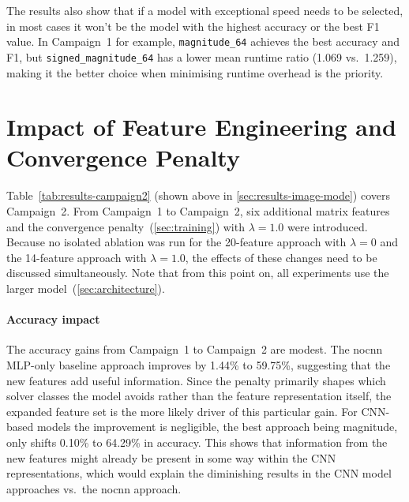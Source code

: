 The results also show that if a model with exceptional speed needs to be selected, in most cases it won't be the model with the
highest accuracy or the best F1 value.
In Campaign~1 for example, \texttt{magnitude\_64} achieves the best accuracy and F1, but \texttt{signed\_magnitude\_64} has a lower mean runtime ratio (1.069 vs.\ 1.259), making it the better choice when minimising runtime overhead is the priority.

\section{Impact of Feature Engineering and Convergence Penalty}\label{sec:results-features}

Table~\ref{tab:results-campaign2} (shown above in \autoref{sec:results-image-mode}) covers Campaign~2.
From Campaign~1 to Campaign~2, six additional matrix features and the convergence penalty~(\autoref{sec:training}) with $\lambda=1.0$ were introduced.
Because no isolated ablation was run for the 20-feature approach with $\lambda=0$ and the 14-feature approach with
$\lambda=1.0$, the effects of these changes need to be discussed simultaneously.
Note that from this point on, all experiments use the larger model~(\autoref{sec:architecture}).

\paragraph{Accuracy impact}
The accuracy gains from Campaign~1 to Campaign~2 are modest.
The nocnn MLP-only baseline approach improves by 1.44\% to 59.75\%, suggesting that the new features add useful
information.
Since the penalty primarily shapes which solver classes the model avoids rather than the feature representation itself, the
expanded feature set is the more likely driver of this particular gain.
For CNN-based models the improvement is negligible, the best approach being magnitude, only shifts 0.10\% to 64.29\% in accuracy.
This shows that information from the new features might already be present in some way within the CNN representations,
which would explain the diminishing results in the CNN model approaches vs.\ the nocnn approach.

